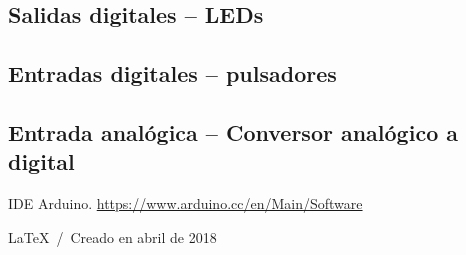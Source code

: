 \documentclass[a4paper]{article}
\begin{document}
\subsection{Salidas digitales -- LEDs}




\subsection{Entradas digitales -- pulsadores}




\subsection{Entrada analógica -- Conversor analógico a digital}



\begin{thebibliography}{9}
   IDE Arduino. \href{https://www.arduino.cc/en/Main/Software}{https://www.arduino.cc/en/Main/Software}
\end{thebibliography}

\vfill
\begin{flushright}
  \LaTeX~/~Creado en abril de 2018
\end{flushright}
\end{document}
